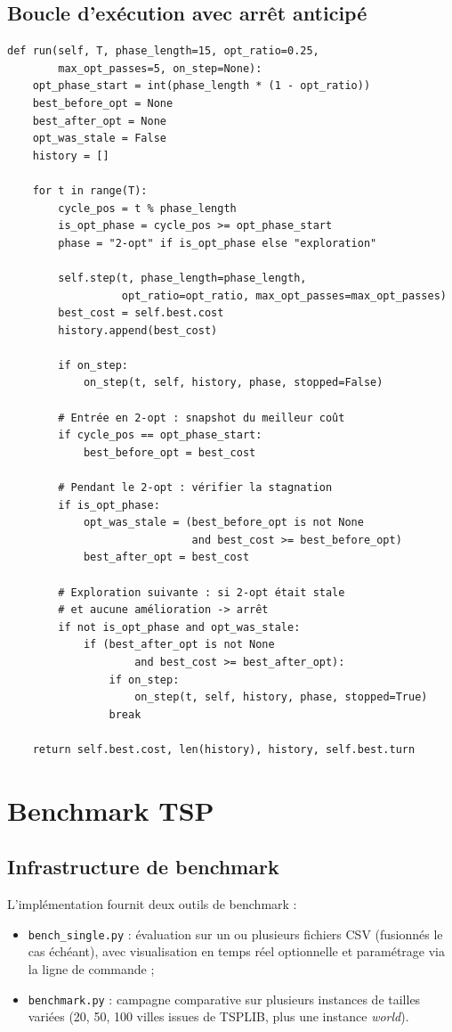 \documentclass[12pt,a4paper]{report}
\begin{document}
\section{Boucle d'exécution avec arrêt anticipé}
\begin{lstlisting}
def run(self, T, phase_length=15, opt_ratio=0.25,
        max_opt_passes=5, on_step=None):
    opt_phase_start = int(phase_length * (1 - opt_ratio))
    best_before_opt = None
    best_after_opt = None
    opt_was_stale = False
    history = []

    for t in range(T):
        cycle_pos = t % phase_length
        is_opt_phase = cycle_pos >= opt_phase_start
        phase = "2-opt" if is_opt_phase else "exploration"

        self.step(t, phase_length=phase_length,
                  opt_ratio=opt_ratio, max_opt_passes=max_opt_passes)
        best_cost = self.best.cost
        history.append(best_cost)

        if on_step:
            on_step(t, self, history, phase, stopped=False)

        # Entrée en 2-opt : snapshot du meilleur coût
        if cycle_pos == opt_phase_start:
            best_before_opt = best_cost

        # Pendant le 2-opt : vérifier la stagnation
        if is_opt_phase:
            opt_was_stale = (best_before_opt is not None
                             and best_cost >= best_before_opt)
            best_after_opt = best_cost

        # Exploration suivante : si 2-opt était stale
        # et aucune amélioration -> arrêt
        if not is_opt_phase and opt_was_stale:
            if (best_after_opt is not None
                    and best_cost >= best_after_opt):
                if on_step:
                    on_step(t, self, history, phase, stopped=True)
                break

    return self.best.cost, len(history), history, self.best.turn
\end{lstlisting}

\chapter{Benchmark TSP}

\section{Infrastructure de benchmark}
L'implémentation fournit deux outils de benchmark :
\begin{itemize}
	\item \texttt{bench\_single.py} : évaluation sur un ou plusieurs fichiers
	      CSV (fusionnés le cas échéant), avec visualisation en temps réel
	      optionnelle et paramétrage via la ligne de commande ;
	\item \texttt{benchmark.py} : campagne comparative sur plusieurs instances
	      de tailles variées (20, 50, 100 villes issues de TSPLIB, plus une
	      instance \textit{world}).
\end{itemize}
\end{document}
